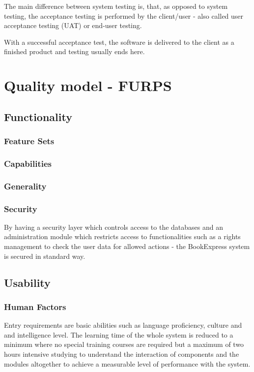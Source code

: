 \documentclass[11pt,a4paper,oneside,svgnames]{report}
\begin{document}
The main difference between system testing is, that, as opposed to system testing, the acceptance testing is performed by the client/user - also called user acceptance testing (UAT) or end-user testing.

With a successful acceptance test, the software is delivered to the client as a finished product and testing usually ends here.


\chapter{Quality model - FURPS}

\section{Functionality}

\subsection{Feature Sets}

\subsection{Capabilities}

\subsection{Generality}

\subsection{Security}
By having a security layer which controls access to the databases and an administration module which restricts access to functionalities such as a rights management to check the user data for allowed actions - the BookExpress system is secured in standard way.

\section{Usability}

\subsection{Human Factors}
Entry requirements are basic abilities such as language proficiency, culture and and intelligence level. The learning time of the whole system is reduced to a minimum where no special training courses are required but a maximum of two hours intensive studying to understand the interaction of components and the modules altogether to achieve a measurable level of performance with the system.
\end{document}
